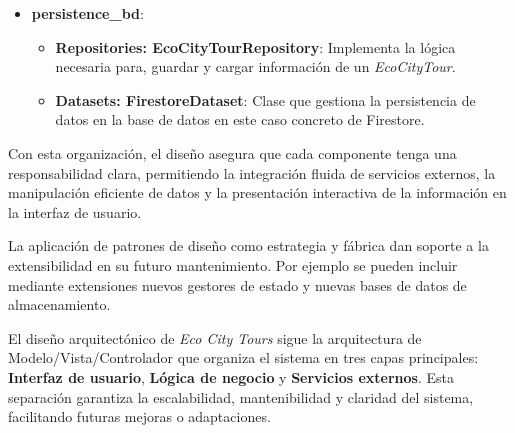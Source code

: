 \begin{itemize}
	\item \textbf{persistence\_bd}:
	\begin{itemize}
		\item \textbf{Repositories: EcoCityTourRepository}: Implementa la lógica necesaria para, guardar y cargar información de un \textit{EcoCityTour}.
		\item \textbf{Datasets: FirestoreDataset}: Clase que gestiona la persistencia de datos en la base de datos en este caso concreto de Firestore.
	\end{itemize}
\end{itemize}

Con esta organización, el diseño asegura que cada componente tenga una responsabilidad clara, permitiendo la integración fluida de servicios externos, la manipulación eficiente de datos y la presentación interactiva de la información en la interfaz de usuario. 

La aplicación de patrones de diseño como estrategia y fábrica dan soporte a la extensibilidad en su futuro mantenimiento. Por ejemplo se pueden incluir mediante extensiones nuevos gestores de estado y nuevas bases de datos de almacenamiento.


El diseño arquitectónico de \textit{Eco City Tours} sigue la arquitectura de Modelo/Vista/Controlador que organiza el sistema en tres capas principales: \textbf{Interfaz de usuario}, \textbf{Lógica de negocio} y \textbf{Servicios externos}. Esta separación garantiza la escalabilidad, mantenibilidad y claridad del sistema, facilitando futuras mejoras o adaptaciones.

